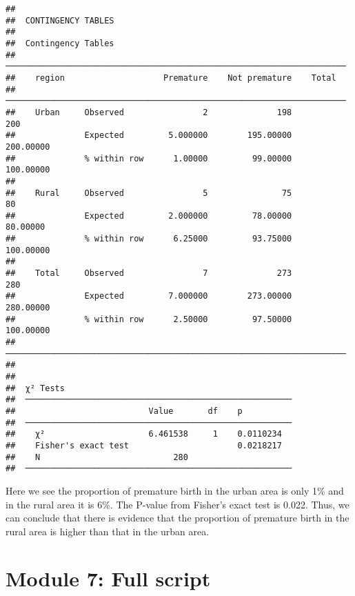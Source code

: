 \documentclass[
]{memoir}
\begin{document}
\begin{verbatim}
## 
##  CONTINGENCY TABLES
## 
##  Contingency Tables                                                    
##  ───────────────────────────────────────────────────────────────────── 
##    region                    Premature    Not premature    Total       
##  ───────────────────────────────────────────────────────────────────── 
##    Urban     Observed                2              198          200   
##              Expected         5.000000        195.00000    200.00000   
##              % within row      1.00000         99.00000    100.00000   
##                                                                        
##    Rural     Observed                5               75           80   
##              Expected         2.000000         78.00000     80.00000   
##              % within row      6.25000         93.75000    100.00000   
##                                                                        
##    Total     Observed                7              273          280   
##              Expected         7.000000        273.00000    280.00000   
##              % within row      2.50000         97.50000    100.00000   
##  ───────────────────────────────────────────────────────────────────── 
## 
## 
##  χ² Tests                                               
##  ────────────────────────────────────────────────────── 
##                           Value       df    p           
##  ────────────────────────────────────────────────────── 
##    χ²                     6.461538     1    0.0110234   
##    Fisher's exact test                      0.0218217   
##    N                           280                      
##  ──────────────────────────────────────────────────────
\end{verbatim}

Here we see the proportion of premature birth in the urban area is only 1\% and in the rural area it is 6\%. The P-value from Fisher's exact test is 0.022. Thus, we can conclude that there is evidence that the proportion of premature birth in the rural area is higher than that in the urban area.

\hypertarget{module-7-full-script}{%
\chapter*{Module 7: Full script}\label{module-7-full-script}}
\end{document}

